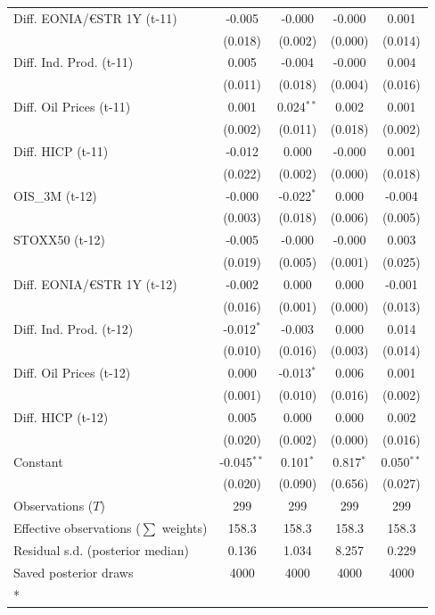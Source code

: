\begin{longtable}[t]{lcccc}
Diff. EONIA/€STR 1Y (t-11) & -0.005 & -0.000 & -0.000 & 0.001\\
 & (0.018) & (0.002) & (0.000) & (0.014)\\
Diff. Ind. Prod. (t-11) & 0.005 & -0.004 & -0.000 & 0.004\\
 & (0.011) & (0.018) & (0.004) & (0.016)\\
Diff. Oil Prices (t-11) & 0.001 & 0.024$^{**}$ & 0.002 & 0.001\\
 & (0.002) & (0.011) & (0.018) & (0.002)\\
Diff. HICP (t-11) & -0.012 & 0.000 & -0.000 & 0.001\\
 & (0.022) & (0.002) & (0.000) & (0.018)\\
OIS\_3M (t-12) & -0.000 & -0.022$^{*}$ & 0.000 & -0.004\\
 & (0.003) & (0.018) & (0.006) & (0.005)\\
STOXX50 (t-12) & -0.005 & -0.000 & -0.000 & 0.003\\
 & (0.019) & (0.005) & (0.001) & (0.025)\\
Diff. EONIA/€STR 1Y (t-12) & -0.002 & 0.000 & 0.000 & -0.001\\
 & (0.016) & (0.001) & (0.000) & (0.013)\\
Diff. Ind. Prod. (t-12) & -0.012$^{*}$ & -0.003 & 0.000 & 0.014\\
 & (0.010) & (0.016) & (0.003) & (0.014)\\
Diff. Oil Prices (t-12) & 0.000 & -0.013$^{*}$ & 0.006 & 0.001\\
 & (0.001) & (0.010) & (0.016) & (0.002)\\
Diff. HICP (t-12) & 0.005 & 0.000 & 0.000 & 0.002\\
 & (0.020) & (0.002) & (0.000) & (0.016)\\
Constant & -0.045$^{**}$ & 0.101$^{*}$ & 0.817$^{*}$ & 0.050$^{**}$\\
 & (0.020) & (0.090) & (0.656) & (0.027)\\
\midrule
Observations ($T$) & 299 & 299 & 299 & 299\\
Effective observations ($\sum$ weights) & 158.3 & 158.3 & 158.3 & 158.3\\
Residual s.d. (posterior median) & 0.136 & 1.034 & 8.257 & 0.229\\
Saved posterior draws & 4000 & 4000 & 4000 & 4000\\*
\end{longtable}
\endgroup{}

